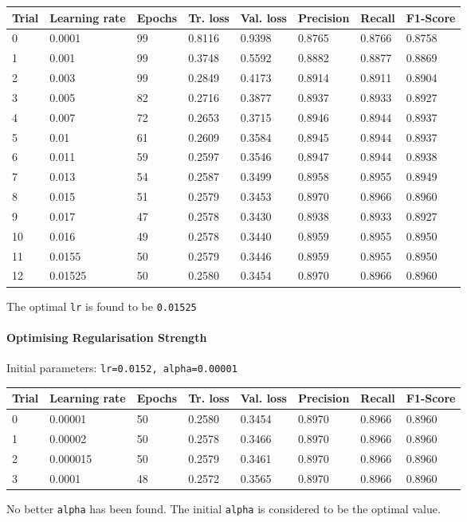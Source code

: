 \documentclass[11pt]{article}
\begin{document}
\begin{longtable}[]{@{}llllllll@{}}
\toprule
Trial & Learning rate & Epochs & Tr. loss & Val. loss & Precision &
Recall & F1-Score\tabularnewline
\midrule
\endhead
0 & 0.0001 & 99 & 0.8116 & 0.9398 & 0.8765 & 0.8766 &
0.8758\tabularnewline
1 & 0.001 & 99 & 0.3748 & 0.5592 & 0.8882 & 0.8877 &
0.8869\tabularnewline
2 & 0.003 & 99 & 0.2849 & 0.4173 & 0.8914 & 0.8911 &
0.8904\tabularnewline
3 & 0.005 & 82 & 0.2716 & 0.3877 & 0.8937 & 0.8933 &
0.8927\tabularnewline
4 & 0.007 & 72 & 0.2653 & 0.3715 & 0.8946 & 0.8944 &
0.8937\tabularnewline
5 & 0.01 & 61 & 0.2609 & 0.3584 & 0.8945 & 0.8944 &
0.8937\tabularnewline
6 & 0.011 & 59 & 0.2597 & 0.3546 & 0.8947 & 0.8944 &
0.8938\tabularnewline
7 & 0.013 & 54 & 0.2587 & 0.3499 & 0.8958 & 0.8955 &
0.8949\tabularnewline
8 & 0.015 & 51 & 0.2579 & 0.3453 & 0.8970 & 0.8966 &
0.8960\tabularnewline
9 & 0.017 & 47 & 0.2578 & 0.3430 & 0.8938 & 0.8933 &
0.8927\tabularnewline
10 & 0.016 & 49 & 0.2578 & 0.3440 & 0.8959 & 0.8955 &
0.8950\tabularnewline
11 & 0.0155 & 50 & 0.2579 & 0.3446 & 0.8959 & 0.8955 &
0.8950\tabularnewline
12 & 0.01525 & 50 & 0.2580 & 0.3454 & 0.8970 & 0.8966 &
0.8960\tabularnewline
\bottomrule
\end{longtable}

The optimal \texttt{lr} is found to be \texttt{0.01525}

\hypertarget{optimising-regularisation-strength-1}{%
\paragraph{Optimising Regularisation
Strength}\label{optimising-regularisation-strength-1}}

Initial parameters: \texttt{lr=0.0152,\ alpha=0.00001}

\begin{longtable}[]{@{}llllllll@{}}
\toprule
Trial & Learning rate & Epochs & Tr. loss & Val. loss & Precision &
Recall & F1-Score\tabularnewline
\midrule
\endhead
0 & 0.00001 & 50 & 0.2580 & 0.3454 & 0.8970 & 0.8966 &
0.8960\tabularnewline
1 & 0.00002 & 50 & 0.2578 & 0.3466 & 0.8970 & 0.8966 &
0.8960\tabularnewline
2 & 0.000015 & 50 & 0.2579 & 0.3461 & 0.8970 & 0.8966 &
0.8960\tabularnewline
3 & 0.0001 & 48 & 0.2572 & 0.3565 & 0.8970 & 0.8966 &
0.8960\tabularnewline
\bottomrule
\end{longtable}

No better \texttt{alpha} has been found. The initial \texttt{alpha} is
considered to be the optimal value.
\end{document}
